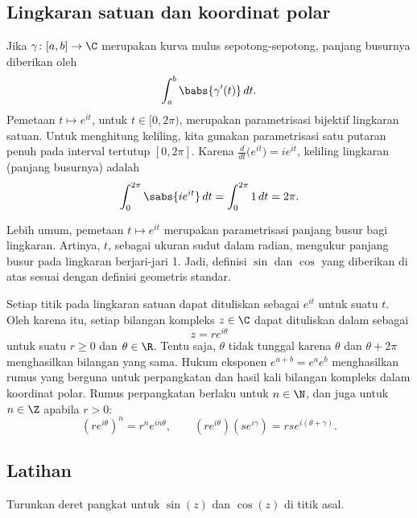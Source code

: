 \subsection{Lingkaran satuan dan koordinat polar}

Jika $\gamma \colon [a,b] \to \C$ merupakan kurva mulus sepotong-sepotong,
panjang busurnya diberikan oleh
\begin{equation*}
\int_a^b \babs{\gamma'(t)} \, dt .
\end{equation*}
Pemetaan $t \mapsto e^{it}$, untuk $t \in [0,2\pi)$, merupakan parametrisasi
bijektif lingkaran satuan. Untuk menghitung keliling, kita gunakan parametrisasi
satu putaran penuh pada interval tertutup $[0,2\pi]$. Karena
$\frac{d}{dt} \bigl( e^{it} \bigr) = ie^{it}$, keliling
lingkaran (panjang busurnya) adalah
\begin{equation*}
\int_0^{2\pi} \sabs{i e^{it}}  \,  dt
=
\int_0^{2\pi} 1  \,  dt  = 2\pi .
\end{equation*}

Lebih umum, pemetaan $t \mapsto e^{it}$ merupakan parametrisasi panjang busur bagi lingkaran.
Artinya, $t$, sebagai ukuran sudut dalam radian, mengukur panjang busur pada
lingkaran berjari-jari 1. Jadi, definisi $\sin$ dan $\cos$ yang diberikan
di atas sesuai dengan definisi geometris standar.

Setiap titik pada lingkaran satuan dapat dituliskan sebagai $e^{it}$ untuk suatu $t$.
Oleh karena itu, setiap bilangan kompleks $z \in \C$ dapat dituliskan dalam
\emph{} sebagai
\begin{equation*}
z = r e^{i\theta}
\end{equation*}
untuk suatu $r \geq 0$ dan $\theta \in \R$. Tentu saja, $\theta$
tidak tunggal karena $\theta$ dan $\theta+2\pi$ menghasilkan bilangan yang sama.
Hukum eksponen $e^{a+b} = e^a e^b$ menghasilkan rumus yang berguna untuk perpangkatan
dan hasil kali bilangan kompleks dalam koordinat polar. Rumus perpangkatan berlaku untuk
$n \in \N$, dan juga untuk $n \in \Z$ apabila $r > 0$:
\begin{equation*}
{(r e^{i\theta})}^n
= r^n e^{i n \theta} ,
\qquad
(r e^{i\theta})
(s e^{i\gamma})
=
rs e^{i(\theta+\gamma)} .
\end{equation*}

\subsection{Latihan}

\begin{exercise}
Turunkan deret pangkat untuk $\sin(z)$ dan $\cos(z)$ di titik asal.
\end{exercise}

